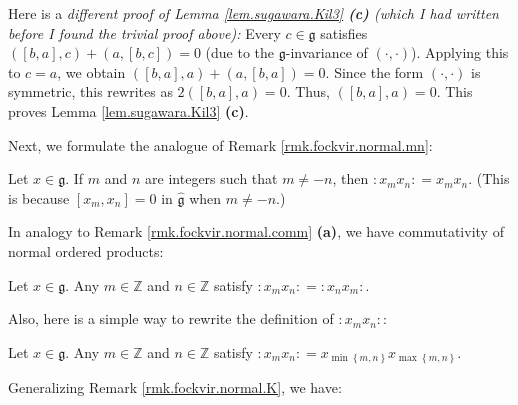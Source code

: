 \documentclass[etingof-lie.tex]{subfiles}
\begin{document}
\begin{noncompile}
Here is a \textit{different proof of Lemma \ref{lem.sugawara.Kil3}
\textbf{(c)} (which I had written before I found the trivial proof above):}
Every $c\in\mathfrak{g}$ satisfies $\left(  \left[  b,a\right]  ,c\right)
+\left(  a,\left[  b,c\right]  \right)  =0$ (due to the $\mathfrak{g}%
$-invariance of $\left(  \cdot,\cdot\right)  $). Applying this to $c=a$, we
obtain $\left(  \left[  b,a\right]  ,a\right)  +\left(  a,\left[  b,a\right]
\right)  =0$. Since the form $\left(  \cdot,\cdot\right)  $ is symmetric, this
rewrites as $2\left(  \left[  b,a\right]  ,a\right)  =0$. Thus, $\left(
\left[  b,a\right]  ,a\right)  =0$. This proves Lemma \ref{lem.sugawara.Kil3}
\textbf{(c)}.
\end{noncompile}

Next, we formulate the analogue of Remark \ref{rmk.fockvir.normal.mn}:

\begin{remark}
\label{rmk.sugawara.normal.mn}Let $x\in\mathfrak{g}$. If $m$ and $n$ are
integers such that $m\neq-n$, then $\left.  :x_{m}x_{n}:\right.  =x_{m}x_{n}$.
(This is because $\left[  x_{m},x_{n}\right]  =0$ in $\widehat{\mathfrak{g}}$
when $m\neq-n$.)
\end{remark}

In analogy to Remark \ref{rmk.fockvir.normal.comm} \textbf{(a)}, we have
commutativity of normal ordered products:

\begin{remark}
\label{rmk.sugawara.normal.comm}Let $x\in\mathfrak{g}$. Any $m\in\mathbb{Z}$
and $n\in\mathbb{Z}$ satisfy $\left.  :x_{m}x_{n}:\right.  =\left.
:x_{n}x_{m}:\right.  $.
\end{remark}

Also, here is a simple way to rewrite the definition of $\left.  :x_{m}%
x_{n}:\right.  $:

\begin{remark}
\label{rmk.sugawara.normal.max}Let $x\in\mathfrak{g}$. Any $m\in\mathbb{Z}$
and $n\in\mathbb{Z}$ satisfy $\left.  :x_{m}x_{n}:\right.  =x_{\min\left\{
m,n\right\}  }x_{\max\left\{  m,n\right\}  }$.
\end{remark}

Generalizing Remark \ref{rmk.fockvir.normal.K}, we have:
\end{document}

